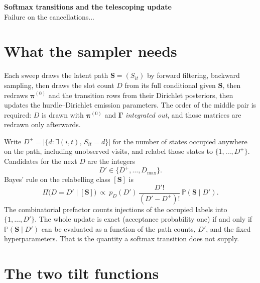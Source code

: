 \documentclass[11pt,a4paper]{article}
\newcommand{\bs}{\boldsymbol}
\newcommand{\Prb}{\mathbb{P}}
\newcommand{\bGamma}{\boldsymbol{\Gamma}}
\newcommand{\Dplus}{D^{+}}
\newcommand{\Dmax}{D_{\max}}
\theoremstyle{plain}
\theoremstyle{definition}
\theoremstyle{remark}
\begin{document}
\thispagestyle{plain}
\begin{center}
{\LARGE\bfseries Softmax transitions and the telescoping update}\\[0.45em]
{\large Failure on the cancellations...}
\end{center}
\vspace{0.7em}

\section{What the sampler needs}

Each sweep draws the latent path $\bs S=(S_{it})$ by forward filtering,
backward sampling, then draws the slot count $D$ from its full conditional
given $\bs S$, then redraws $\bs\pi^{(0)}$ and the transition rows from
their Dirichlet posteriors, then updates the hurdle--Dirichlet emission
parameters. The order of the middle pair is required: $D$ is drawn with
$\bs\pi^{(0)}$ and $\bGamma$ \emph{integrated out}, and those matrices are
redrawn only afterwards.

Write $\Dplus=\lvert\{d:\exists(i,t),\,S_{it}=d\}\rvert$ for the number of
states occupied anywhere on the path, including unobserved visits, and
relabel those states to $\{1,\dots,\Dplus\}$. Candidates for the next $D$
are the integers
\[
D'\in\{\Dplus,\dots,\Dmax\}.
\]
Bayes' rule on the relabelling class $[\bs S]$ is
\begin{equation}
\Pi\bigl(D=D'\mid[\bs S]\bigr)
\ \propto\
p_D(D')\,\frac{D'!}{(D'-\Dplus)!}\,
\Prb(\bs S\mid D').
\label{eq:bayes}
\end{equation}
The combinatorial prefactor counts injections of the occupied labels into
$\{1,\dots,D'\}$. The whole update is exact (acceptance probability one)
if and only if $\Prb(\bs S\mid D')$ can be evaluated as a function of the
path counts, $D'$, and the fixed hyperparameters. That is the quantity a
softmax transition does not supply.

\section{The two tilt functions}
\end{document}
